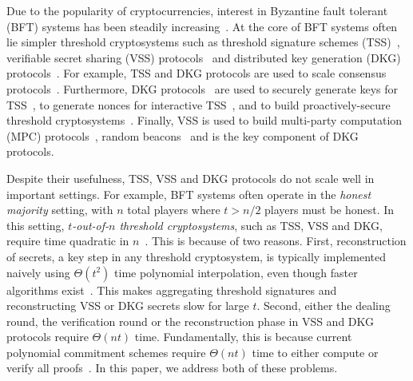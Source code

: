 
Due to the popularity of cryptocurrencies, interest in Byzantine fault tolerant (BFT) systems has been steadily increasing~\cite{bitcoin,ethereum,sbft,algorand,dfinity,ouroboros,ouroboros-praos,ouroboros-genesis,randherd}.
At the core of BFT systems often lie simpler threshold cryptosystems such as threshold signature schemes (TSS)~\cite{Boldyreva2003Threshold,Shoup2000Practical}, verifiable secret sharing (VSS) protocols~\cite{Pedersen1991Noninteractive,CGMA85,polycommit} and distributed key generation (DKG) protocols~\cite{Pedersen1991AThreshold,dkg,Kate2010Distributed}.
For example, TSS and DKG protocols are used to scale consensus protocols~\cite{sbft,dfinity,constantinople}.
Furthermore, DKG protocols~\cite{dkg} are used to securely generate keys for TSS~\cite{KateGoldberg2009Distributed}, to generate nonces for interactive TSS~\cite{threshold-schnorr,GennaroGoldfederNarayanan2016ThresholdOptimal}, and to build proactively-secure threshold cryptosystems~\cite{Herzberg1995ProactiveSecret,Herzberg1997ProactivePublic}.
Finally, VSS is used to build multi-party computation (MPC) protocols~\cite{GRR98p}, random beacons~\cite{randherd,scrape,ouroboros} and is the key component of DKG protocols.

Despite their usefulness, TSS, VSS and DKG protocols do not scale well in important settings.
For example, BFT systems often operate in the \textit{honest majority} setting, with $n$ total players where $t > n/2$ players must be honest.
In this setting, \textit{$t$-out-of-$n$ threshold cryptosystems}, such as TSS, VSS and DKG, require time quadratic in $n$~\cite{Feldman1987Practical,Pedersen1991Noninteractive,polycommit,Boldyreva2003Threshold}.
This is because of two reasons.
First, reconstruction of secrets, a key step in any threshold cryptosystem, is typically implemented naively using $\Theta(t^2)$ time polynomial interpolation, even though faster algorithms exist~\cite{moderncomputeralgebra-ch10}.
This makes aggregating threshold signatures and reconstructing VSS or DKG secrets slow for large $t$.
Second, either the dealing round, the verification round or the reconstruction phase in VSS and DKG protocols require $\Theta(nt)$ time.
Fundamentally, this is because current polynomial commitment schemes require $\Theta(nt)$ time to either compute or verify all proofs~\cite{Feldman1987Practical,Pedersen1991Noninteractive,polycommit}.
In this paper, we address both of these problems.

